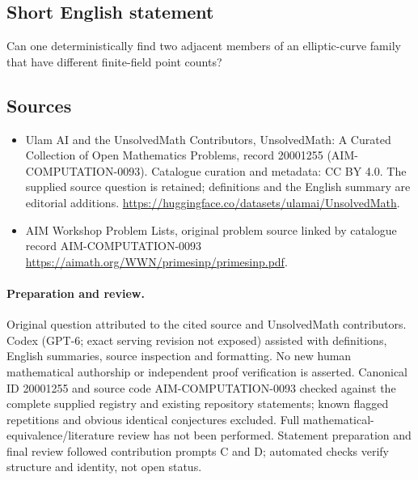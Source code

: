\documentclass[11pt]{article}
\begin{document}
\subsection{Short English statement}
Can one deterministically find two adjacent members of an elliptic-curve family that have different finite-field point counts?
\subsection{Sources}
\begin{itemize}
\item[\hypertarget{source:20001255:1}{S1}] Ulam AI and the UnsolvedMath Contributors, UnsolvedMath: A Curated Collection of Open Mathematics Problems, record 20001255 (AIM-COMPUTATION-0093). Catalogue curation and metadata: CC BY 4.0. The supplied source question is retained; definitions and the English summary are editorial additions.
\url{https://huggingface.co/datasets/ulamai/UnsolvedMath}.
\item[\hypertarget{source:20001255:2}{S2}] AIM Workshop Problem Lists, original problem source linked by catalogue record AIM-COMPUTATION-0093
\url{https://aimath.org/WWN/primesinp/primesinp.pdf}.
\end{itemize}
\paragraph{Preparation and review.}
Original question attributed to the cited source and UnsolvedMath contributors. Codex (GPT-6; exact serving revision not exposed) assisted with definitions, English summaries, source inspection and formatting. No new human mathematical authorship or independent proof verification is asserted. Canonical ID 20001255 and source code AIM-COMPUTATION-0093 checked against the complete supplied registry and existing repository statements; known flagged repetitions and obvious identical conjectures excluded. Full mathematical-equivalence/literature review has not been performed. Statement preparation and final review followed contribution prompts C and D; automated checks verify structure and identity, not open status.
\label{end:20001255}
\end{document}
